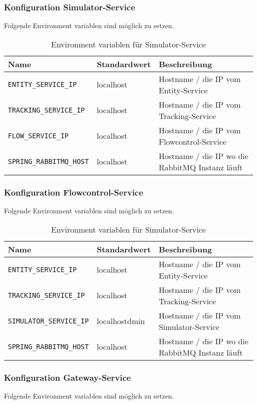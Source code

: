 \subsubsection{Konfiguration Simulator-Service}
Folgende Environment variablen sind möglich zu setzen.

\begin{table}[h]
	\begin{tabular}{|l|l|l|}
		\hline
		Name & Standardwert & Beschreibung \\ \hline
		\verb|ENTITY_SERVICE_IP| & localhost &  Hostname / die IP vom Entity-Service \\ \hline
		\verb|TRACKING_SERVICE_IP| & localhost  &  Hostname / die IP vom Tracking-Service  \\ \hline
		\verb|FLOW_SERVICE_IP| & localhost &  Hostname / die IP vom Flowcontrol-Service  \\ \hline
		\verb|SPRING_RABBITMQ_HOST| & localhost &  Hostname / die IP wo die RabbitMQ Instanz läuft  \\ \hline		
	\end{tabular}
	\caption{Environment variablen für Simulator-Service }
\end{table}

\subsubsection{Konfiguration Flowcontrol-Service}
Folgende Environment variablen sind möglich zu setzen.

\begin{table}[h]
	\begin{tabular}{|l|l|l|}
		\hline
		Name & Standardwert & Beschreibung \\ \hline
		\verb|ENTITY_SERVICE_IP| & localhost &  Hostname / die IP vom Entity-Service \\ \hline
		\verb|TRACKING_SERVICE_IP| & localhost  &  Hostname / die IP vom Tracking-Service  \\ \hline
		\verb|SIMULATOR_SERVICE_IP| & localhostdmin &  Hostname / die IP vom Simulator-Service  \\ \hline
		\verb|SPRING_RABBITMQ_HOST| & localhost &  Hostname / die IP wo die RabbitMQ Instanz läuft  \\ \hline		
	\end{tabular}
	\caption{Environment variablen für Simulator-Service }
\end{table}

\subsubsection{Konfiguration Gateway-Service}
Folgende Environment variablen sind möglich zu setzen.


